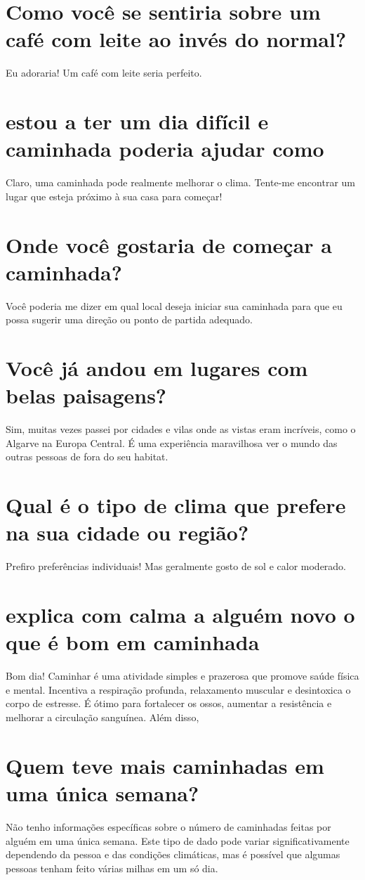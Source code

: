 \documentclass[11pt,a4paper]{article}
\begin{document}
\section{Como você se sentiria sobre um café com leite ao invés do normal?}
Eu adoraria! Um café com leite seria perfeito.

\section{estou a ter um dia difícil e caminhada poderia ajudar como}
Claro, uma caminhada pode realmente melhorar o clima. Tente-me encontrar um lugar que esteja próximo à sua casa para começar!

\section{Onde você gostaria de começar a caminhada?}
Você poderia me dizer em qual local deseja iniciar sua caminhada para que eu possa sugerir uma direção ou ponto de partida adequado.

\section{Você já andou em lugares com belas paisagens?}
Sim, muitas vezes passei por cidades e vilas onde as vistas eram incríveis, como o Algarve na Europa Central. É uma experiência maravilhosa ver o mundo das outras pessoas de fora do seu habitat.

\section{Qual é o tipo de clima que prefere na sua cidade ou região?}
Prefiro preferências individuais! Mas geralmente gosto de sol e calor moderado.

\section{explica com calma a alguém novo o que é bom em caminhada}
Bom dia! Caminhar é uma atividade simples e prazerosa que promove saúde física e mental. Incentiva a respiração profunda, relaxamento muscular e desintoxica o corpo de estresse. É ótimo para fortalecer os ossos, aumentar a resistência e melhorar a circulação sanguínea. Além disso,

\section{Quem teve mais caminhadas em uma única semana?}
Não tenho informações específicas sobre o número de caminhadas feitas por alguém em uma única semana. Este tipo de dado pode variar significativamente dependendo da pessoa e das condições climáticas, mas é possível que algumas pessoas tenham feito várias milhas em um só dia.
\end{document}
